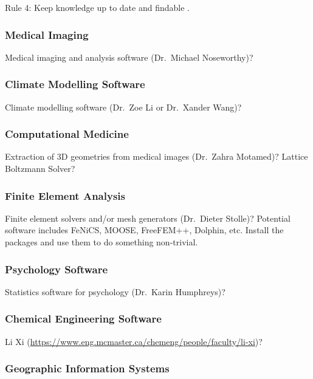 \documentclass[12pt]{article}
\begin{document}
Rule 4: Keep knowledge up to date and findable \citep{ShollerEtAl2019}.

\subsubsection{Medical Imaging}

Medical imaging and analysis software (Dr.\ Michael Noseworthy)?

\subsubsection{Climate Modelling Software}

Climate modelling software (Dr.\ Zoe Li or Dr.\ Xander Wang)?

\subsubsection{Computational Medicine}

Extraction of 3D geometries from medical images (Dr.\ Zahra Motamed)?  Lattice
Boltzmann Solver?

\subsubsection{Finite Element Analysis}

Finite element solvers and/or mesh generators (Dr.\ Dieter Stolle)?  Potential
software includes FeNiCS, MOOSE, FreeFEM++, Dolphin, etc.  Install the packages
and use them to do something non-trivial.

\subsubsection{Psychology Software}

Statistics software for psychology (Dr.\ Karin Humphreys)?

\subsubsection{Chemical Engineering Software}

Li Xi (\url{https://www.eng.mcmaster.ca/chemeng/people/faculty/li-xi})?

\subsubsection{Geographic Information Systems}
\end{document}
